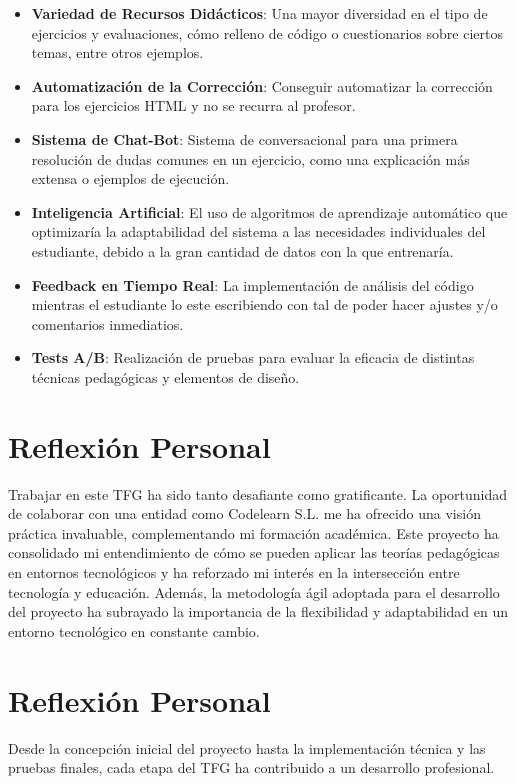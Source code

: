 \begin{itemize}
    \item \textbf{Variedad de Recursos Didácticos}: Una mayor diversidad en el tipo de ejercicios y evaluaciones, cómo relleno de código o cuestionarios sobre ciertos temas, entre otros ejemplos.
    \item \textbf{Automatización  de la Corrección}: Conseguir automatizar la corrección para los ejercicios HTML y no se recurra al profesor. 
    \item \textbf{Sistema de Chat-Bot}: Sistema de conversacional para una primera resolución de dudas comunes en un ejercicio, como una explicación más extensa o ejemplos de ejecución.  
    \item \textbf{Inteligencia Artificial}: El uso de algoritmos de aprendizaje automático que optimizaría la adaptabilidad del sistema a las necesidades individuales del estudiante, debido a la gran cantidad de datos con la que entrenaría.
    \item \textbf{Feedback en Tiempo Real}: La implementación de análisis del código mientras el estudiante lo este escribiendo con tal de poder hacer ajustes y/o comentarios inmediatios.
    \item \textbf{Tests A/B}: Realización de pruebas para evaluar la eficacia de distintas técnicas pedagógicas y elementos de diseño.
  \end{itemize}

\section{Reflexión Personal}

Trabajar en este TFG ha sido tanto desafiante como gratificante. La oportunidad de colaborar con una entidad como Codelearn S.L. me ha ofrecido una visión práctica invaluable, complementando mi formación académica. Este proyecto ha consolidado mi entendimiento de cómo se pueden aplicar las teorías pedagógicas en entornos tecnológicos y ha reforzado mi interés en la intersección entre tecnología y educación. Además, la metodología ágil adoptada para el desarrollo del proyecto ha subrayado la importancia de la flexibilidad y adaptabilidad en un entorno tecnológico en constante cambio.

\section{Reflexión Personal}
Desde la concepción inicial del proyecto hasta la implementación técnica y las pruebas finales, cada etapa del TFG ha contribuido a un desarrollo profesional.

